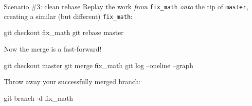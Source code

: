 \begin{frame}[fragile]{Scenario \#3: clean rebase}
  Replay the work \emph{from} \texttt{fix\_math} \emph{onto} the tip
  of \texttt{master}, creating a similar (but
  different) \texttt{fix\_math}:

  \begin{gitCommand}
git checkout fix_math
git rebase master
  \end{gitCommand}

  Now the merge is a fast-forward!

  \begin{gitCommand}
git checkout master
git merge fix_math
git log --oneline --graph
  \end{gitCommand}

  Throw away your successfully merged branch:

  \begin{gitCommand}git branch -d fix_math\end{gitCommand}
\end{frame}


